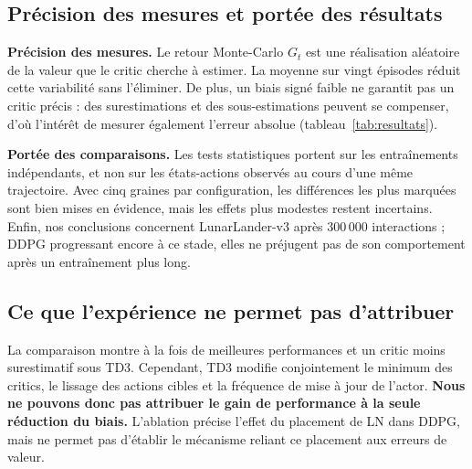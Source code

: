 \documentclass[10pt,a4paper]{article}
\begin{document}
\begin{center}
\end{center}
\vspace{-4pt}

\subsection{Précision des mesures et portée des résultats}
\noindent\textbf{Précision des mesures.} Le retour Monte-Carlo $G_t$ est une réalisation aléatoire de la valeur que le critic cherche à estimer. La moyenne sur vingt épisodes réduit cette variabilité sans l'éliminer. De plus, un biais signé faible ne garantit pas un critic précis : des surestimations et des sous-estimations peuvent se compenser, d'où l'intérêt de mesurer également l'erreur absolue (tableau~\ref{tab:resultats}).

\noindent\textbf{Portée des comparaisons.} Les tests statistiques portent sur les entraînements indépendants, et non sur les états-actions observés au cours d'une même trajectoire. Avec cinq graines par configuration, les différences les plus marquées sont bien mises en évidence, mais les effets plus modestes restent incertains. Enfin, nos conclusions concernent LunarLander-v3 après 300\,000 interactions ; DDPG progressant encore à ce stade, elles ne préjugent pas de son comportement après un entraînement plus long.

\subsection{Ce que l'expérience ne permet pas d'attribuer}
La comparaison montre à la fois de meilleures performances et un critic moins surestimatif sous TD3. Cependant, TD3 modifie conjointement le minimum des critics, le lissage des actions cibles et la fréquence de mise à jour de l'actor. \textbf{Nous ne pouvons donc pas attribuer le gain de performance à la seule réduction du biais.} L'ablation précise l'effet du placement de LN dans DDPG, mais ne permet pas d'établir le mécanisme reliant ce placement aux erreurs de valeur.
\end{document}
